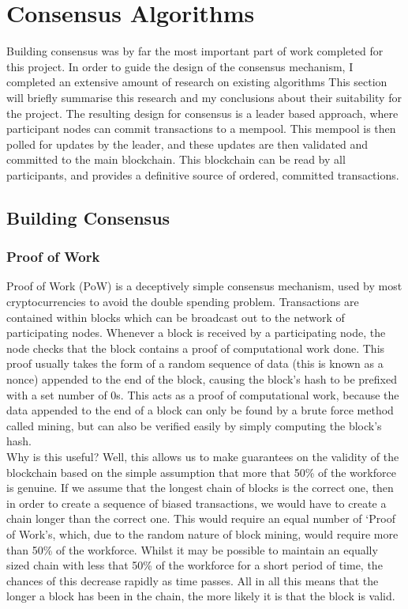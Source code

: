 \documentclass[12pt,a4paper,twoside,openright]{report}
\begin{document}
	\section{Consensus Algorithms}\label{sec:consensus}
	Building consensus was by far the most important part of work completed for this project. 
	In order to guide the design of the consensus mechanism, I completed an extensive amount of research on existing algorithms
	This section will briefly summarise this research and my conclusions about their suitability for the project. 
	The resulting design for consensus is a leader based approach, where participant nodes can commit transactions to a mempool.
	This mempool is then polled for updates by the leader, and these updates are then validated and committed to the main blockchain.
	This blockchain can be read by all participants, and provides a definitive source of ordered, committed transactions.

		\subsection{Building Consensus}
			\subsubsection*{Proof of Work}
			Proof of Work (PoW) is a deceptively simple consensus mechanism, used by most cryptocurrencies to avoid the double spending problem.
			Transactions are contained within blocks which can be broadcast out to the network of participating nodes. 
			Whenever a block is received by a participating node, the node checks that the block contains a proof of computational work done. 
			This proof usually takes the form of a random sequence of data (this is known as a nonce) appended to the end of the block, causing the block's hash to be prefixed with a set number of 0s.
			This acts as a proof of computational work, because the data appended to the end of a block can only be found by a brute force method called mining, but can also be verified easily by simply computing the block's hash.\\
			
			Why is this useful? 
			Well, this allows us to make guarantees on the validity of the blockchain based on the simple assumption that more that 50\% of the workforce is genuine.
			If we assume that the longest chain of blocks is the correct one, then in order to create a sequence of biased transactions, we would have to create a chain longer than the correct one. 
			This would require an equal number of `Proof of Work's, which, due to the random nature of block mining, would require more than 50\% of the workforce.
			Whilst it may be possible to maintain an equally sized chain with less that 50\% of the workforce for a short period of time, the chances of this decrease rapidly as time passes.
			All in all this means that the longer a block has been in the chain, the more likely it is that the block is valid.\\
\end{document}
